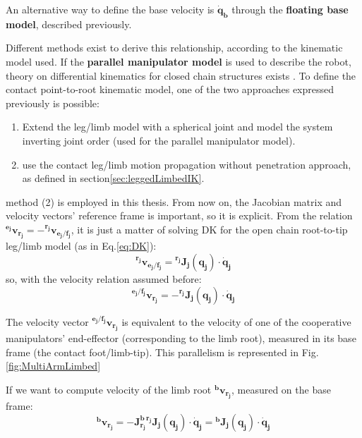 An alternative way to define the base velocity is $\mathbf{\dot{q}_b}$ through the \textbf{floating base model}, described previously. 

Different methods exist to derive this relationship, according to the kinematic model used. 
If the \textbf{parallel manipulator model} is used to describe the robot, theory on differential kinematics for closed chain structures exists \cite{Siciliano}\cite{RoboticMechanics}.
To define the contact point-to-root kinematic model, one of the two approaches expressed previously is possible: 
\begin{enumerate}
    \item Extend the leg/limb model with a spherical joint and model the system inverting joint order (used for the parallel manipulator model).
    \item use the contact leg/limb motion propagation without penetration approach, as defined in section\ref{sec:leggedLimbedIK}. 
\end{enumerate}

method (2) is employed in this thesis.
From now on, the Jacobian matrix and velocity vectors' reference frame is important, so it is explicit.
From the relation $\mathbf{^{e_j}v_{r_j}} = -\mathbf{^{r_j}v_{e_j/f_j}}$, it is just a matter of solving DK for the open chain root-to-tip leg/limb model (as in Eq.\ref{eq:DK}): 
\begin{equation*}
\label{eq:LegDKInversed1}
 \mathbf{^{r_j}v_{{e_j}/{f_j}}} = \mathbf{{^{r_j}J_j}(q_j)}\cdot\mathbf{\dot{q}_j}
\end{equation*}
so, with the velocity relation assumed before:
\begin{equation}
\label{eq:LegDKInversed2}
 \mathbf{^{e_j/f_j}v_{r_j}} = -\mathbf{{^{r_j}J_j}(q_j)}\cdot\mathbf{\dot{q}_j}
\end{equation}

The velocity vector $\mathbf{^{e_j/f_j}v_{r_j}}$ is equivalent to the velocity of one of the cooperative manipulators' end-effector (corresponding to the limb root), measured in its base frame (the contact foot/limb-tip). This parallelism is represented in Fig.\ref{fig:MultiArmLimbed}  

If we want to compute velocity of the limb root $\mathbf{^b v_{r_j}}$, measured on the base frame: 
\begin{equation}
\label{eq:rootDK_baseframe}
 \mathbf{^b v_{r_j}} = -\mathbf{J^b_{r_j}}\mathbf{{^{r_j}J_j}(q_j)}\cdot\mathbf{\dot{q}_j} = \mathbf{^b J_j(q_j)}\cdot\mathbf{\dot{q}_j}
\end{equation}

